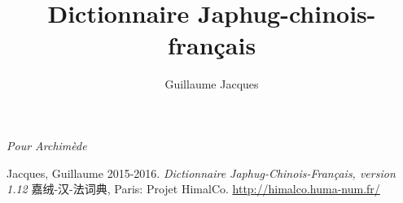 \documentclass[twoside]{article}
\title{Dictionnaire Japhug-chinois-français\\\zh{嘉绒-汉-法词典\\ Version 1.12}}
\author{Guillaume Jacques\\\zh{向柏霖}}
\newcommand{\zh}[1]{{\cn #1}}
\newenvironment{bottompar}{\par\vspace*{\fill}}{\clearpage}
\begin{document}
\maketitle
\newpage
{}
\begin{flushright}
\textit{Pour Archimède}
\end{flushright}
\begin{bottompar}
Jacques, Guillaume 2015-2016. \textit{Dictionnaire Japhug-Chinois-Français, version 1.12} \zh{嘉绒-汉-法词典}, Paris: Projet HimalCo. \url{http://himalco.huma-num.fr/}
\end{bottompar}
\end{document}
